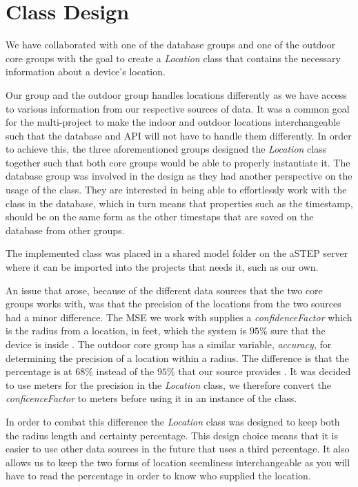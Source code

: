 \section{Class Design}\label{sec:class_design}
We have collaborated with one of the database groups and one of the outdoor core groups with the goal to create a \textit{Location} class that contains the necessary information about a device's location. 

Our group and the outdoor group handles locations differently as we have access to various information from our respective sources of data. It was a common goal for the multi-project to make the indoor and outdoor locations interchangeable such that the database and API will not have to handle them differently. In order to achieve this, the three aforementioned groups designed the \textit{Location} class together such that both core groups would be able to properly instantiate it. The database group was involved in the design as they had another perspective on the usage of the class. They are interested in being able to effortlessly work with the class in the database, which in turn means that properties such as the timestamp, should be on the same form as the other timestaps that are saved on the database from other groups. 

The implemented class was placed in a shared model folder on the aSTEP server %
where it can be imported into the projects that needs it, such as our own. 

An issue that arose, because of the different data sources that the two core groups works with, was that the precision of the locations from the two sources had a minor difference. The MSE we work with supplies a \textit{confidenceFactor} which is the radius from a location, in feet, which the system is $95\%$ sure that the device is inside \cite{MSE_faq}. The outdoor core group has a similar variable, \textit{accuracy}, for determining the precision of a location within a radius. The difference is that the percentage is at $68\%$ instead of the $95\%$ that our source provides \cite{android_getAccuracy}. It was decided to use meters for the precision in the \textit{Location} class, we therefore convert the \textit{conficenceFactor} to meters before using it in an instance of the class. 

In order to combat this difference the \textit{Location} class was designed to keep both the radius length and certainty percentage. This design choice means that it is easier to use other data sources in the future that uses a third percentage. It also allows us to keep the two forms of location seemliness interchangeable as you will have to read the percentage in order to know who supplied the location.